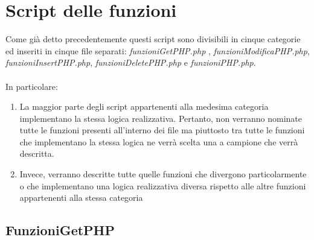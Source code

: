 \documentclass [a4paper, 12pt]{book}
\begin{document}
\section{Script delle funzioni}
Come già detto precedentemente questi script sono divisibili in cinque categorie ed inseriti in cinque file separati: \textit{funzioniGetPHP.php} , \textit{funzioniModificaPHP.php}, \textit{funzioniInsertPHP.php}, \textit{funzioniDeletePHP.php} e \textit{funzioniPHP.php}.\\\\
In particolare:
\begin{enumerate}
\item La maggior parte degli script appartenenti alla medesima categoria implementano la stessa logica realizzativa. Pertanto, non verranno nominate tutte le funzioni presenti all'interno dei file ma piuttosto tra tutte le funzioni che implementano la stessa logica ne verrà scelta una a campione che verrà descritta.
\item Invece, verranno descritte tutte quelle funzioni che divergono particolarmente o che implementano una logica realizzativa diversa rispetto alle altre funzioni appartenenti alla stessa categoria
\end{enumerate}
\subsection{FunzioniGetPHP}
\end{document}
